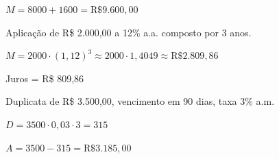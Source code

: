 \documentclass[12pt]{article}
\begin{document}
\begin{multicols}{2}
$M = 8000 + 1600 = \boxed{\text{R\$ } 9.600{,}00}$


Aplicação de R\$ 2.000,00 a 12\% a.a. composto por 3 anos.

$M = 2000 \cdot (1{,}12)^3 \approx 2000 \cdot 1{,}4049 \approx \boxed{\text{R\$ } 2.809{,}86}$

Juros = R\$ 809{,}86


Duplicata de R\$ 3.500,00, vencimento em 90 dias, taxa 3\% a.m.

$D = 3500 \cdot 0{,}03 \cdot 3 = 315$

$A = 3500 - 315 = \boxed{\text{R\$ } 3.185{,}00}$

\end{multicols}


\end{document}

